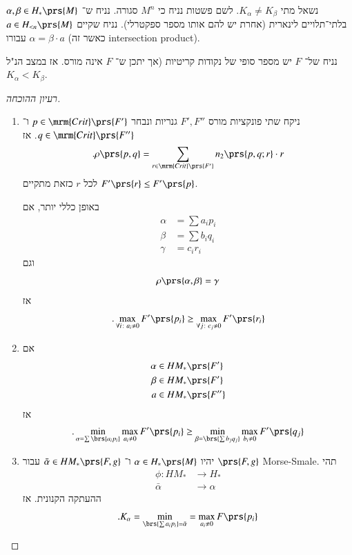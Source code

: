 \documentclass[a4paper,10pt,twoside,openany]{book}
\begin{document}
נשאל מתי
$K_{\alpha} \neq K_{\beta}$.
לשם פשטות נניח כי
$M^n$
סגורה.
נניח ש־%
$\alpha,\beta \in H_*\prs{M}$
בלתי־תלויים לינארית (אחרת יש להם אותו מספר ספקטרלי).
נניח שקיים
$a \in H_{<n}\prs{M}$
עבורו
$\alpha = \beta \cdot a$
(כאשר זה
\textenglish{intersection product}).

\begin{theorem}
נניח של־%
$F$
יש מספר סופי של נקודות קריטיות (אך יתכן ש־%
$F$
אינה מורס.
אז במצב הנ"ל
$K_\alpha < K_\beta$.
\end{theorem}

\begin{proof}[רעיון ההוכחה]
\begin{enumerate}
\item ניקח שתי פונקציות מורס
$F', F''$
גנריות ונבחר
$p \in \mrm{Crit}\prs{F'}$
ו־%
$q \in \mrm{Crit}\prs{F''}$.
אז
\[\text{.} \rho\prs{p,q} = \sum_{r \in \mrm{Crit}\prs{F'}} n_2\prs{p,q;r} \cdot r\]
לכל
$r$
כזאת מתקיים
$F'\prs{r} \leq F'\prs{p}$.

באופן כללי יותר, אם
\begin{align*}
\alpha &= \sum a_i p_i \\
\beta &= \sum b_i q_i \\
\gamma &= c_i r_i
\end{align*}
וגם
\[\rho\prs{\alpha,\beta} = \gamma\]
אז
\[\text{.} \max_{\forall i\colon a_i \neq 0} F'\prs{p_i} \geq \max_{\forall j \colon c_j \neq 0} F'\prs{r_i}\]

\item 
אם
\begin{align*}
\alpha &\in HM_*\prs{F'} \\
\beta &\in HM_*\prs{F'} \\
a &\in HM_*\prs{F''}
\end{align*}
אז
\begin{align*}
\text{.} \min_{\alpha = \sum \brs{a_i p_i}} \max_{a_i \neq 0} F'\prs{p_i} \geq \min_{\beta = \brs{\sum b_j q_j}} \max_{b_i \neq 0} F'\prs{q_j}
\end{align*}

\item יהיו
$\alpha \in H_*\prs{M}$
ו־%
$\bar{\alpha} \in HM_*\prs{F, g}$
עבור
$\prs{F,g}$
\textenglish{Morse-Smale}.
תהי
\begin{align*}
\phi \colon HM_* &\to H_* \\
\bar{\alpha} &\to \alpha
\end{align*}
ההעתקה הקנונית. אז
\[\text{.} K_\alpha = \min_{\brs{\sum a_i p_i} = \bar{\alpha}} = \max_{a_i \neq 0} F\prs{p_i}\]


\end{enumerate}
\end{proof}
\end{document}
